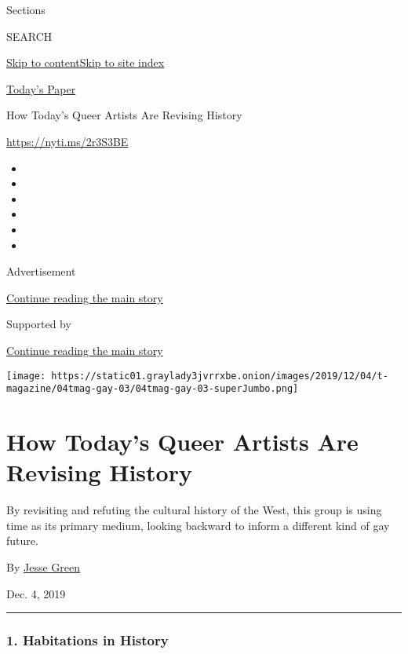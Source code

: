 Sections

SEARCH

\protect\hyperlink{site-content}{Skip to
content}\protect\hyperlink{site-index}{Skip to site index}

\href{https://myaccount.nytimes3xbfgragh.onion/auth/login?response_type=cookie\&client_id=vi}{}

\href{https://www.nytimes3xbfgragh.onion/section/todayspaper}{Today's
Paper}

How Today's Queer Artists Are Revising History

\url{https://nyti.ms/2r3S3BE}

\begin{itemize}
\item
\item
\item
\item
\item
\item
\end{itemize}

Advertisement

\protect\hyperlink{after-top}{Continue reading the main story}

Supported by

\protect\hyperlink{after-sponsor}{Continue reading the main story}

\texttt{[image: https://static01.graylady3jvrrxbe.onion/images/2019/12/04/t-magazine/04tmag-gay-03/04tmag-gay-03-superJumbo.png]}

\hypertarget{how-todays-queer-artists-are-revising-history}{%
\section{How Today's Queer Artists Are Revising
History}\label{how-todays-queer-artists-are-revising-history}}

By revisiting and refuting the cultural history of the West, this group
is using time as its primary medium, looking backward to inform a
different kind of gay future.

By \href{https://www.nytimes3xbfgragh.onion/by/jesse-green}{Jesse Green}

Dec. 4, 2019

\begin{center}\rule{0.5\linewidth}{\linethickness}\end{center}

\hypertarget{1-habitations-in-history}{%
\subsubsection{1. Habitations in
History}\label{1-habitations-in-history}}

